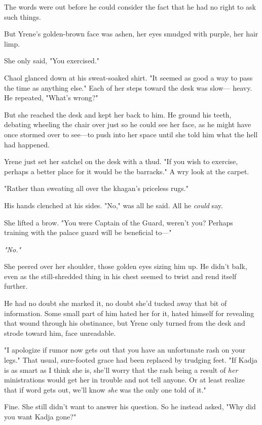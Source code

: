 The words were out before he could consider the fact that he had no right to ask such things.

But Yrene's golden-brown face was ashen, her eyes smudged with purple, her hair limp.

She only said, "You exercised."

Chaol glanced down at his sweat-soaked shirt.
"It seemed as good a way to pass the time as anything else."
Each of her steps toward the desk was slow--- heavy.
He repeated, "What's wrong?"

But she reached the desk and kept her back to him.
He ground his teeth, debating wheeling the chair over just so he could see her face, as he might have once stormed over to see---to push into her space until she told him what the hell had happened.

Yrene just set her satchel on the desk with a thud.
"If you wish to exercise, perhaps a better place for it would be the barracks."
A wry look at the carpet.

"Rather than sweating all over the khagan's priceless rugs."

His hands clenched at his sides.
"No," was all he said.
All he \emph{could} say.

She lifted a brow.
"You were Captain of the Guard, weren't you?
Perhaps training with the palace guard will be beneficial to---"

\emph{"No."}

She peered over her shoulder, those golden eyes sizing him up.
He didn't balk, even as the still-shredded thing in his chest seemed to twist and rend itself further.

He had no doubt she marked it, no doubt she'd tucked away that bit of information.
Some small part of him hated her for it, hated himself for revealing that wound through his obstinance, but Yrene only turned from the desk and strode toward him, face unreadable.

"I apologize if rumor now gets out that you have an unfortunate rash on your legs."
That usual, sure-footed grace had been replaced by trudging feet.
"If Kadja is as smart as I think she is, she'll worry that the rash being a result of \emph{her} ministrations would get her in trouble and not tell anyone.
Or at least realize that if word gets out, we'll know \emph{she} was the only one told of it."

Fine.
She still didn't want to answer his question.
So he instead asked, "Why did you want Kadja gone?"

